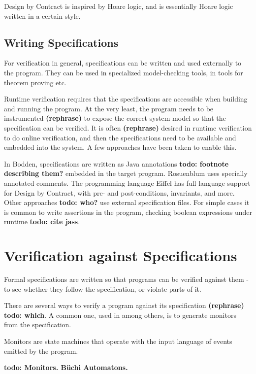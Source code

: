 \documentclass[a4paper,11pt]{kth-mag}
\newcommand{\todo}[1]{\textbf{todo: #1}}
\newcommand{\rephrase}{\textbf{(rephrase)} }
\begin{document}
Design by Contract is inspired by Hoare logic, and is essentially Hoare logic
written in a certain style.

\subsection{Writing Specifications}

For verification in general, specifications can be written and used externally
to the program. They can be used in specialized model-checking tools, in tools
for theorem proving etc.

Runtime verification requires that the specifications are accessible when
building and running the program. At the very least, the program needs to be
instrumented \rephrase to expose the correct system model so that the
specification can be verified. It is often \rephrase desired in runtime
verification to do online verification, and then the specifications need to be
available and embedded into the system. A few approaches have been taken to
enable this.

In Bodden, specifications are written as Java annotations \todo{footnote
describing them?} embedded in the target program. Rosuenblum
\cite{rosenblum95practicalassertions} uses specially annotated comments. The
programming language Eiffel has full language support for Design by Contract,
with pre- and post-conditions, invariants, and more. Other approaches
\todo{who?} use external specification files. For simple cases it is common to
write assertions in the program, checking boolean expressions under runtime
\todo{cite jass}.


\section{Verification against Specifications} \label{section-verification}

Formal specifications are written so that programs can be verified against them
- to see whether they follow the specification, or violate parts of it.

There are several ways to verify a program against its specification \rephrase
\todo{which}. A common one, used in
\cite{bauer06monitoring,bodden05efficientrv} among others, is to generate
monitors from the specification.

Monitors are state machines that operate with the input language of events
emitted by the program.

\todo{Monitors. Büchi Automatons.}
\end{document}
